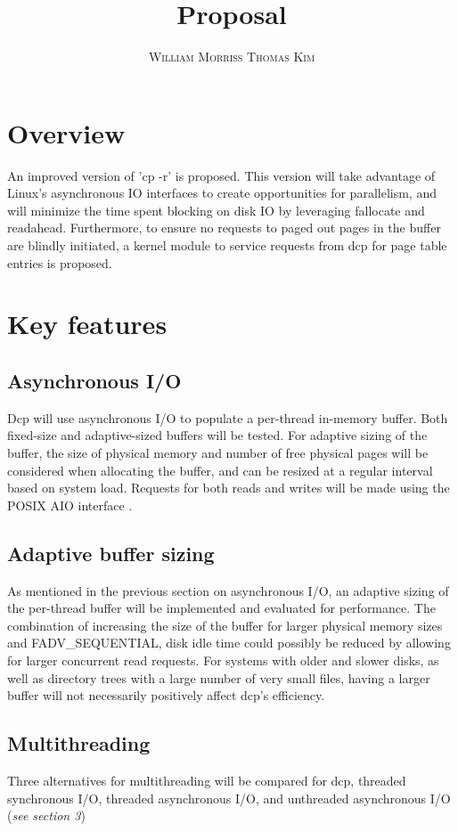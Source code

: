 \documentclass[12pt]{article}
\title{\vspace{-25mm}\fontsize{16pt}{10pt}\selectfont\textbf{Proposal}} %
\author{
  \textsc{William Morriss}
  \textsc{Thomas Kim}
}
\date{}
\begin{document}
\maketitle %

\section{Overview}
An improved version of 'cp -r' is proposed.
This version will take advantage of Linux's asynchronous IO interfaces to create
opportunities for parallelism, and will minimize the time spent blocking on disk
IO by leveraging fallocate and readahead. Furthermore, to ensure no requests to
paged out pages in the buffer are blindly initiated, a kernel module to service
requests from dcp for page table entries is proposed.

\section{Key features}
\subsection{Asynchronous I/O}
Dcp will use asynchronous I/O to populate a per-thread in-memory buffer.
Both fixed-size and adaptive-sized buffers will be tested.
For adaptive sizing of the buffer, the size of physical memory
and number of free physical pages will be considered when allocating
the buffer, and can be resized at a regular interval based on system load.
Requests for both reads and writes will be made using the POSIX AIO interface
\cite{manaio}.

\subsection{Adaptive buffer sizing}
As mentioned in the previous section on asynchronous I/O, an adaptive
sizing of the per-thread buffer will be implemented and evaluated for
performance. The combination of increasing the size of the buffer for
larger physical memory sizes and FADV\_SEQUENTIAL, disk idle time could
possibly be reduced by allowing for larger concurrent read requests.
For systems with older and slower disks, as well as directory trees
with a large number of very small files, having a larger buffer
will not necessarily positively affect dcp's efficiency.

\subsection{Multithreading}
Three alternatives for multithreading will be compared for dcp,
threaded synchronous I/O, threaded asynchronous I/O, and unthreaded
asynchronous I/O (\textit{see section 3})
\end{document}
